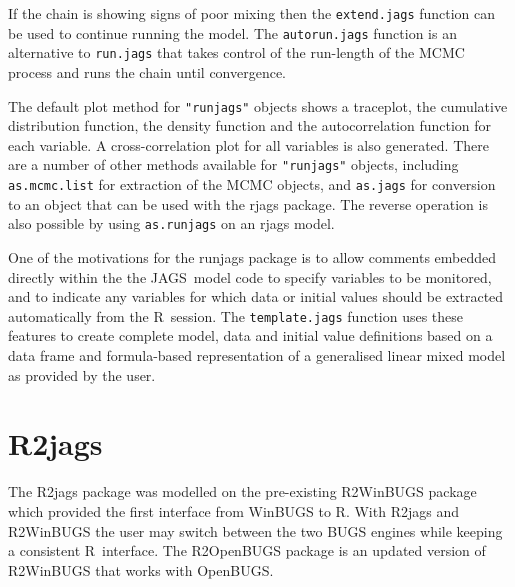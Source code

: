 \documentclass[11pt, a4paper, titlepage]{report}
\newcommand{\JAGS}{\textsf{JAGS}}
\newcommand{\R}{\textsf{R}}
\begin{document}
If the chain is showing signs of poor mixing then the
\texttt{extend.jags} function can be used to continue running the
model. The \texttt{autorun.jags} function is an alternative to
\texttt{run.jags} that takes control of the run-length of the MCMC
process and runs the chain until convergence.

The default plot method for \texttt{"runjags"} objects shows a
traceplot, the cumulative distribution function, the density function
and the autocorrelation function for each variable. A
cross-correlation plot for all variables is also generated.  There are
a number of other methods available for \texttt{"runjags"} objects,
including \texttt{as.mcmc.list} for extraction of the MCMC objects,
and \texttt{as.jags} for conversion to an object that can be used with
the rjags package.  The reverse operation is also possible by using
\texttt{as.runjags} on an rjags model.

One of the motivations for the runjags package is to allow comments
embedded directly within the the \JAGS\ model code to specify 
variables to be monitored, and to indicate any variables for which data 
or initial values should be extracted automatically from the \R\ session.  
The \texttt{template.jags} function uses these features to create 
complete model, data and initial value definitions based on a data
frame and formula-based representation of a generalised linear mixed 
model as provided by the user.

\section{R2jags}

The R2jags package \citep{SuYajima2015} was modelled on the
pre-existing R2WinBUGS package \citep{SturtzEtal2005} which provided
the first interface from WinBUGS to \R. With R2jags and R2WinBUGS the
user may switch between the two BUGS engines while keeping a
consistent \R\ interface. The R2OpenBUGS package is an updated version
of R2WinBUGS that works with OpenBUGS.
\end{document}
